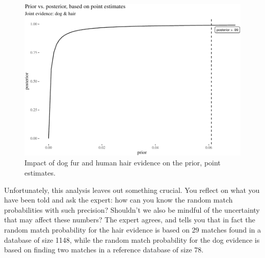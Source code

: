 \documentclass[
  10pt,
  dvipsnames,enabledeprecatedfontcommands]{scrartcl}
\begin{document}
\begin{figure}[H]

\begin{center}\includegraphics[width=0.8\linewidth]{chapter-outline_files/figure-latex/impactOfPoint4-1} \end{center}
\caption{Impact of dog fur and human hair evidence on the prior, point estimates.}
\label{fig:impactOfPoint}
\end{figure}

Unfortunately, this analysis leaves out something crucial. You reflect
on what you have been told and ask the expert: how can you know the
random match probabilities with such precision? Shouldn't we also be
mindful of the uncertainty that may affect these numbers? The expert
agrees, and tells you that in fact the random match probability for the
hair evidence is based on 29 matches found in a database of size 1148,
while the random match probability for the dog evidence is based on
finding two matches in a reference database of size 78.
\end{document}
